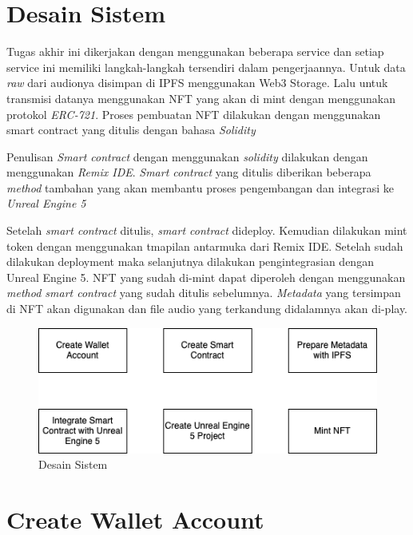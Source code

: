 \section{Desain Sistem}

Tugas akhir ini dikerjakan dengan menggunakan beberapa service dan setiap service ini memiliki langkah-langkah tersendiri dalam pengerjaannya.
Untuk data \emph{raw} dari audionya disimpan di IPFS menggunakan Web3 Storage. Lalu untuk transmisi datanya menggunakan NFT yang akan di mint
dengan menggunakan protokol \emph{ERC-721}. Proses pembuatan NFT dilakukan dengan menggunakan smart contract yang ditulis dengan bahasa \emph{Solidity}

Penulisan \emph{Smart contract} dengan menggunakan \emph{solidity} dilakukan dengan menggunakan \emph{Remix IDE}.
\emph{Smart contract} yang ditulis diberikan beberapa \emph{method} tambahan yang akan membantu proses pengembangan dan integrasi ke \emph{Unreal Engine 5}

Setelah \emph{smart contract} ditulis, \emph{smart contract} dideploy. Kemudian dilakukan mint token dengan menggunakan tmapilan antarmuka dari Remix IDE.
Setelah sudah dilakukan deployment maka selanjutnya dilakukan pengintegrasian dengan Unreal Engine 5. NFT yang sudah di-mint dapat diperoleh dengan menggunakan
\emph{method smart contract} yang sudah ditulis sebelumnya. \emph{Metadata} yang tersimpan di NFT akan digunakan dan file audio yang terkandung didalamnya akan
di-play.

\begin{figure}[H]
  \centering

  \includegraphics[scale=1]{gambar/desainsistem.png}

  \caption{Desain Sistem}
  \label{fig:desainsistem}
\end{figure}

\section{Create Wallet Account}

